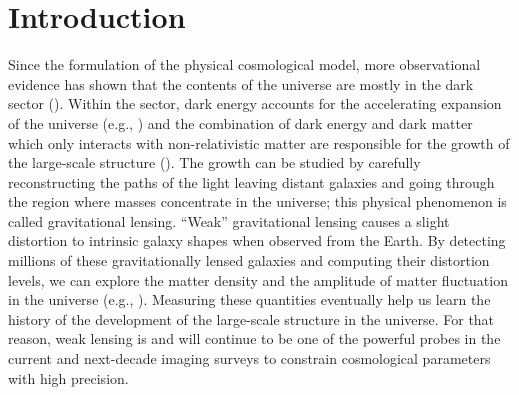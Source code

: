 \documentclass[fleqn,usenatbib]{mnras}
\begin{document}

\section{Introduction}

Since the formulation of the physical cosmological model, more observational evidence has shown that the contents of the universe are mostly in the dark sector (\citealt{2020A&A...633A..69H, 2018PhRvD..98d3528T, 2019PhRvL.122q1301A, 2019PASJ...71...43H, 2021A&A...645A.104A}). Within the sector, dark energy accounts for the accelerating expansion of the universe (e.g., \citealt{1998AJ....116.1009R, 1999AIPC..478..129P}) and the combination of dark energy and dark matter which only interacts with non-relativistic matter are responsible for the growth of the large-scale structure (\citealt{2015RPPh...78h6901K, 2017grle.book.....D}). The growth can be studied by carefully reconstructing the paths of the light leaving distant galaxies and going through the region where masses concentrate in the universe; this physical phenomenon is called gravitational lensing. “Weak” gravitational lensing causes a slight distortion to intrinsic galaxy shapes when observed from the Earth. By detecting millions of these gravitationally lensed galaxies and computing their distortion levels, we can explore the matter density and the amplitude of matter fluctuation in the universe (e.g., \citealt{2001PhR...340..291B}). Measuring these quantities eventually help us learn the history of the development of the large-scale structure in the universe. For that reason, weak lensing is and will continue to be one of the powerful probes in the current and next-decade imaging surveys to constrain cosmological parameters with high precision. \par
\end{document}
